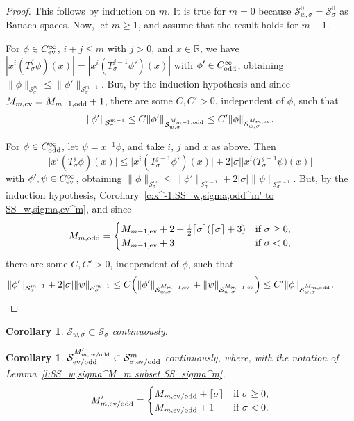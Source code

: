 \documentclass[11pt]{article}
\newtheorem{Corollary}[Theorem]{Corollary}
\newcommand{\R}{\mathbb{R}}
\renewcommand{\SS}{\mathcal{S}}
\newcommand{\Cinf}{C^\infty}
\begin{document}
\begin{proof}
  This follows by induction on $m$. It is true for $m=0$ because $\SS_{w,\sigma}^0=\SS_\sigma^0$ as Banach spaces. Now, let $m\ge1$, and assume that the result holds for $m-1$.

  For $\phi\in\Cinf_{\text{\rm ev}}$, $i+j\le m$ with $j>0$, and $x\in\R$, we have $|x^i(T_\sigma^j\phi)(x)|=|x^i(T_\sigma^{j-1}\phi')(x)|$ with $\phi'\in \Cinf_{\text{\rm odd}}$, obtaining $\|\phi\|_{\SS_\sigma^m}\le\|\phi'\|_{\SS_\sigma^{m-1}}$. But, by the induction hypothesis and since $M_{m,\text{\rm ev}}=M_{m-1,\text{\rm odd}}+1$, there are some $C,C'>0$, independent of $\phi$, such that
    \[
      \|\phi'\|_{\SS_\sigma^{m-1}}\le C \|\phi'\|_{\SS_{w,\sigma}^{M_{m-1,\text{\rm odd}}}}\le C' \|\phi\|_{\SS_{w,\sigma}^{M_{m,\text{\rm ev}}}} .
    \]

  For $\phi\in \Cinf_{\text{\rm odd}}$, let $\psi=x^{-1}\phi$, and take $i$, $j$ and $x$ as above. Then
    \[
      \big|x^i(T_\sigma^j\phi)(x)\big|\le \big|x^i(T_\sigma^{j-1}\phi')(x)\big|
      +2 |\sigma|\big|x^i\big(T_\sigma^{j-1}\psi\big)(x)\big|
    \]
  with $\phi',\psi\in\Cinf_{\text{\rm ev}}$, obtaining $\|\phi\|_{\SS_\sigma^m}\le\|\phi'\|_{\SS_\sigma^{m-1}}+2 |\sigma| \|\psi\|_{\SS_\sigma^{m-1}}$. But, by the induction hypothesis, Corollary~\ref{c:x^-1:SS_w,sigma,odd^m' to SS_w,sigma,ev^m}, and since
    \[
      M_{m,\text{\rm odd}}=
        \begin{cases}
          M_{m-1,\text{\rm ev}}+2+\frac{1}{2}\lceil\sigma\rceil(\lceil\sigma\rceil+3) & \text{if $\sigma\ge0$},\\
          M_{m-1,\text{\rm ev}}+3 & \text{if $\sigma<0$} ,
        \end{cases}
    \]
  there are some $C,C'>0$, independent of $\phi$, such that
    \begin{gather*}
      \|\phi'\|_{\SS_\sigma^{m-1}}+2 |\sigma| \|\psi\|_{\SS_\sigma^{m-1}}
      \le C\Big(\|\phi'\|_{\SS_{w,\sigma}^{M_{m-1,\text{\rm ev}}}}
      +\|\psi\|_{\SS_{w,\sigma}^{M_{m-1,\text{\rm ev}}}}\Big)
      \le C' \|\phi\|_{\SS_{w,\sigma}^{M_{m,\text{\rm odd}}}} .\tag*{\qed}
    \end{gather*}
\renewcommand{\qed}{}
\end{proof}

\begin{Corollary}\label{c:SS_w,sigma subset SS_sigma}
  $\SS_{w,\sigma}\subset\SS_\sigma$ continuously.
\end{Corollary}

\begin{Corollary}\label{l:SS_ev/odd^M_m,ev/odd subset SS_sigma,ev/odd^m}
  $\SS_{\text{\rm ev/odd}}^{M'_{m,\text{\rm ev/odd}}}\subset\SS_{\sigma,\text{\rm ev/odd}}^m$ continuously, where, with the notation of Lemma~{\rm \ref{l:SS_w,sigma^M_m subset SS_sigma^m}},
    \[
      M'_{m,\text{\rm ev/odd}}=
        \begin{cases}
          M_{m,\text{\rm ev/odd}}+\lceil\sigma\rceil & \text{if $\sigma\ge0$},\\
          M_{m,\text{\rm ev/odd}}+1 & \text{if $\sigma<0$} .
        \end{cases}
    \]
\end{Corollary}
\end{document}
